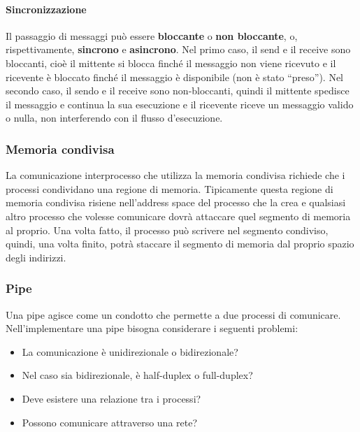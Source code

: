\documentclass[a4]{article}
\begin{document}
\paragraph{Sincronizzazione}
Il passaggio di messaggi può essere \textbf{bloccante} o \textbf{non bloccante}, o, rispettivamente, \textbf{sincrono} e \textbf{asincrono}. Nel primo caso, il send e il receive sono bloccanti, cioè il mittente si blocca finché il messaggio non viene ricevuto e il ricevente è bloccato finché il messaggio è disponibile (non è stato ``preso''). Nel secondo caso, il sendo e il receive sono non-bloccanti, quindi il mittente spedisce il messaggio e continua la sua esecuzione e il ricevente riceve un messaggio valido o nulla, non interferendo con il flusso d'esecuzione.

\subsubsection{Memoria condivisa}
La comunicazione interprocesso che utilizza la memoria condivisa richiede che i processi condividano una regione di memoria. Tipicamente questa regione di memoria condivisa risiene nell'address space del processo che la crea e qualsiasi altro processo che volesse comunicare dovrà attaccare quel segmento di memoria al proprio. Una volta fatto, il processo può scrivere nel segmento condiviso, quindi, una volta finito, potrà staccare il segmento di memoria dal proprio spazio degli indirizzi.

\subsubsection{Pipe}
Una pipe agisce come un condotto che permette a due processi di comunicare. Nell'implementare una pipe bisogna considerare i seguenti problemi:
\begin{itemize}
    \item La comunicazione è unidirezionale o bidirezionale?
    \item Nel caso sia bidirezionale, è half-duplex o full-duplex?
    \item Deve esistere una relazione tra i processi?
    \item Possono comunicare attraverso una rete?
\end{itemize}
\end{document}
